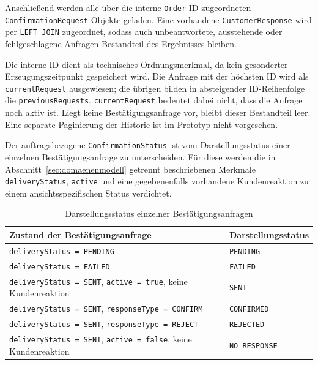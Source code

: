 \documentclass[
  12pt,
  a4paper,
  oneside
]{article}
\begin{document}
Anschließend werden alle über die interne \texttt{Order}-ID zugeordneten
\texttt{ConfirmationRequest}-Objekte geladen. Eine vorhandene
\texttt{CustomerResponse} wird per \texttt{LEFT JOIN} zugeordnet, sodass auch
unbeantwortete, ausstehende oder fehlgeschlagene Anfragen Bestandteil des
Ergebnisses bleiben.

Die interne ID dient als technisches Ordnungsmerkmal, da kein gesonderter
Erzeugungszeitpunkt gespeichert wird. Die Anfrage mit der höchsten ID wird als
\texttt{currentRequest} ausgewiesen; die übrigen bilden in absteigender
ID-Reihenfolge die \texttt{previousRequests}. \texttt{currentRequest} bedeutet
dabei nicht, dass die Anfrage noch aktiv ist. Liegt keine
Bestätigungsanfrage vor, bleibt dieser Bestandteil leer. Eine separate
Paginierung der Historie ist im Prototyp nicht vorgesehen.

Der auftragsbezogene \texttt{ConfirmationStatus} ist vom Darstellungsstatus
einer einzelnen Bestätigungsanfrage zu unterscheiden. Für diese werden die
in Abschnitt~\ref{sec:domaenenmodell} getrennt beschriebenen Merkmale
\texttt{deliveryStatus}, \texttt{active} und eine gegebenenfalls vorhandene
Kundenreaktion zu einem ansichtsspezifischen Status verdichtet.

\begin{table}[htbp]
  \centering
  \small
  \renewcommand{\arraystretch}{1.15}
  \caption{Darstellungsstatus einzelner Bestätigungsanfragen}
  \label{tab:anfrage-darstellungsstatus}
  \begin{tabularx}{\textwidth}{@{}
    >{\raggedright\arraybackslash}X
    >{\raggedright\arraybackslash}p{}@{}}
    \toprule
    \textbf{Zustand der Bestätigungsanfrage}
      & \textbf{Darstellungsstatus} \\
    \midrule
    \texttt{deliveryStatus = PENDING}
      & \texttt{PENDING} \\
    \texttt{deliveryStatus = FAILED}
      & \texttt{FAILED} \\
    \texttt{deliveryStatus = SENT}, \texttt{active = true}, keine
      Kundenreaktion
      & \texttt{SENT} \\
    \texttt{deliveryStatus = SENT}, \texttt{responseType = CONFIRM}
      & \texttt{CONFIRMED} \\
    \texttt{deliveryStatus = SENT}, \texttt{responseType = REJECT}
      & \texttt{REJECTED} \\
    \texttt{deliveryStatus = SENT}, \texttt{active = false}, keine
      Kundenreaktion
      & \texttt{NO\_RESPONSE} \\
    \bottomrule
  \end{tabularx}
\end{table}
\end{document}
